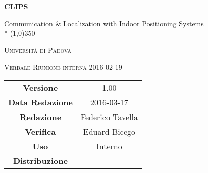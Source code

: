 \documentclass[a4paper,12pt]{article}
\author{Federico Tavella}
\date{17/03/2016}
\begin{document}
\begin{titlepage}
	\centering
	{\huge\bfseries CLIPS\par}
	Communication \& Localization with Indoor Positioning Systems \\*
	\line(1,0){350} \\
	{\scshape\LARGE Università di Padova \par}
	\vspace{1cm}
	{\scshape\Large Verbale Riunione interna 2016-02-19 \par}
	\logo
	\newpage
	\begin{tabular}{c|c}
		{\hfill \textbf{Versione}} 			& 1.00				\\
		{\hfill\textbf{Data Redazione}} 	& 2016-03-17  		\\
		{\hfill\textbf{Redazione}} 			& Federico Tavella	\\
		{\hfill\textbf{Verifica}} 			& Eduard Bicego		\\
		{\hfill\textbf{Uso}} 				& Interno			\\
		{\hfill\textbf{Distribuzione}} 		& \leaf\			\\
	\end{tabular}
\end{titlepage}
	
	\newpage

	
	\label{LastFrontPage}
	

	\newpage
	
	\pagestyle{mymain}
	
	
		

	
		
	
		
	
		\newpage
		
				
	\label{LastPage}
\end{document}
